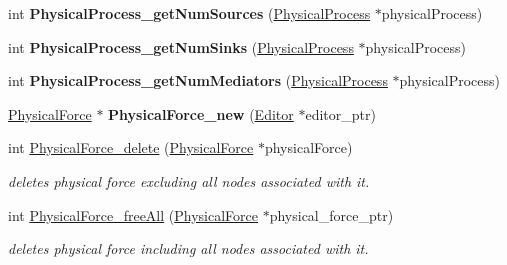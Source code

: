 \begin{DoxyCompactItemize}
\mbox{\label{namespaceomexmeta_aa7371fdf91f4c6c120e4559b23ad3585}} 
int {\bfseries Physical\+Process\+\_\+get\+Num\+Sources} (\hyperlink{classomexmeta_1_1PhysicalProcess}{Physical\+Process} $\ast$physical\+Process)
\item 
\mbox{\label{namespaceomexmeta_aaf4162aa78c2c7f73449705a3e0fc951}} 
int {\bfseries Physical\+Process\+\_\+get\+Num\+Sinks} (\hyperlink{classomexmeta_1_1PhysicalProcess}{Physical\+Process} $\ast$physical\+Process)
\item 
\mbox{\label{namespaceomexmeta_a7ad65f0ec2f5c8433ebc126c75779520}} 
int {\bfseries Physical\+Process\+\_\+get\+Num\+Mediators} (\hyperlink{classomexmeta_1_1PhysicalProcess}{Physical\+Process} $\ast$physical\+Process)
\item 
\mbox{\label{namespaceomexmeta_a20e720c23e2368bf19c316971ebeafd7}} 
\hyperlink{classomexmeta_1_1PhysicalForce}{Physical\+Force} $\ast$ {\bfseries Physical\+Force\+\_\+new} (\hyperlink{classomexmeta_1_1Editor}{Editor} $\ast$editor\+\_\+ptr)
\item 
\mbox{\label{namespaceomexmeta_aad5757f8832cf5fcaf546cec1f97af82}} 
int \hyperlink{namespaceomexmeta_aad5757f8832cf5fcaf546cec1f97af82}{Physical\+Force\+\_\+delete} (\hyperlink{classomexmeta_1_1PhysicalForce}{Physical\+Force} $\ast$physical\+Force)
\begin{DoxyCompactList}\small\item\em deletes physical force excluding all nodes associated with it. \end{DoxyCompactList}\item 
\mbox{\label{namespaceomexmeta_ac9903c88bb127f778476bdffe075ed8a}} 
int \hyperlink{namespaceomexmeta_ac9903c88bb127f778476bdffe075ed8a}{Physical\+Force\+\_\+free\+All} (\hyperlink{classomexmeta_1_1PhysicalForce}{Physical\+Force} $\ast$physical\+\_\+force\+\_\+ptr)
\begin{DoxyCompactList}\small\item\em deletes physical force including all nodes associated with it. \end{DoxyCompactList}\item 
\mbox{\label{namespaceomexmeta_ae66097c6bfe2f6370bcb614a3d384a41}} 

\end{DoxyCompactItemize}
